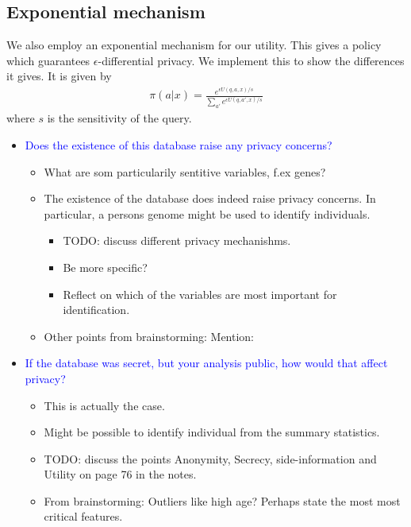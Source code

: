 \subsection*{Exponential mechanism}
 We also employ an exponential mechanism for our utility. This gives a policy which guarantees $\epsilon$-differential privacy. We implement this to show the differences it gives. It is given by
            \begin{align*}
                \pi(a|x) = \frac{ e^{\epsilon U(q,a,x)/s}}{\sum_{a'} e^{\epsilon U(q,a',x)/s}}
            \end{align*}
where $s$ is the sensitivity of the query. 

\begin{itemize}
    \item \textcolor{blue}{Does the existence of this database raise any privacy concerns?}
        \begin{itemize}
            \item What are som particularily sentitive variables, f.ex genes?
            \item The existence of the database does indeed raise privacy concerns. 
            In particular, a persons genome might be used to identify individuals. 
            \begin{itemize}
                \item TODO: discuss different privacy mechanishms. 
                \item Be more specific?
                \item Reflect on which of the variables are most important for identification. 
            \end{itemize}
            \item Other points from brainstorming: Mention: 
        \end{itemize}
    \item \textcolor{blue}{If the database was secret, but your analysis public, how would that affect privacy?}
        \begin{itemize}
            \item This is actually the case. 
            \item Might be possible to identify individual from the summary statistics. 
            \item TODO: discuss the points Anonymity, Secrecy, side-information and Utility on page 76 in the notes. 
            \item From brainstorming: Outliers like high age? Perhaps state the most most critical features. 

\end{itemize}
\end{itemize}
